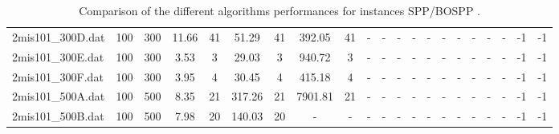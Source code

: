 \begin{sidewaystable}[!ht]
{\begin{tabular}{lcccccccccccccccccccc}
2mis101_300D.dat & 100 & 300 & 11.66 & 41 & 51.29 & 41 & 392.05 & 41 &  - &  - &  - &  - &  - &  - &  - &  - &  - &  - & -1 & -1 \\
2mis101_300E.dat & 100 & 300 & 3.53 & 3 & 29.03 & 3 & 940.72 & 3 &  - &  - &  - &  - &  - &  - &  - &  - &  - &  - & -1 & -1 \\
2mis101_300F.dat & 100 & 300 & 3.95 & 4 & 30.45 & 4 & 415.18 & 4 &  - &  - &  - &  - &  - &  - &  - &  - &  - &  - & -1 & -1 \\
2mis101_500A.dat & 100 & 500 & 8.35 & 21 & 317.26 & 21 & 7901.81 & 21 &  - &  - &  - &  - &  - &  - &  - &  - &  - &  - & -1 & -1 \\
2mis101_500B.dat & 100 & 500 & 7.98 & 20 & 140.03 & 20 &  - &  - &  - &  - &  - &  - &  - &  - &  - &  - &  - &  - & -1 & -1 \\
\bottomrule
\end{tabular}
}%
\caption{Comparison of the different algorithms performances for instances SPP/BOSPP .}
\label{tab:table_compare_SPP/BOSPP }
\end{sidewaystable}
